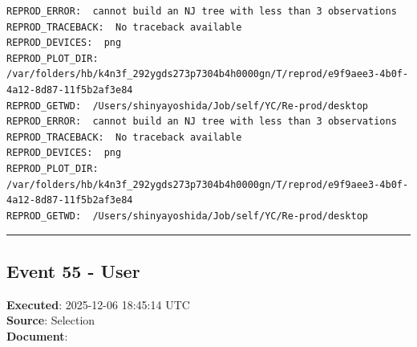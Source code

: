 \documentclass[
  11pt,
]{article}
\newenvironment{rpoutput}{\vspace{0.5em}\begin{snugshade}}{\end{snugshade}}
\begin{document}
\begin{rpoutput}

\begin{verbatim}
REPROD_ERROR:  cannot build an NJ tree with less than 3 observations 
REPROD_TRACEBACK:  No traceback available  
REPROD_DEVICES:  png 
REPROD_PLOT_DIR:  /var/folders/hb/k4n3f_292ygds273p7304b4h0000gn/T/reprod/e9f9aee3-4b0f-4a12-8d87-11f5b2af3e84 
REPROD_GETWD:  /Users/shinyayoshida/Job/self/YC/Re-prod/desktop 
REPROD_ERROR:  cannot build an NJ tree with less than 3 observations 
REPROD_TRACEBACK:  No traceback available  
REPROD_DEVICES:  png 
REPROD_PLOT_DIR:  /var/folders/hb/k4n3f_292ygds273p7304b4h0000gn/T/reprod/e9f9aee3-4b0f-4a12-8d87-11f5b2af3e84 
REPROD_GETWD:  /Users/shinyayoshida/Job/self/YC/Re-prod/desktop 
\end{verbatim}

\end{rpoutput}

\begin{center}\rule{0.5\linewidth}{0.5pt}\end{center}

\subsection{Event 55 - User}\label{event-55---user}

\textbf{Executed}: 2025-12-06 18:45:14 UTC\\
\textbf{Source}: Selection\\
\textbf{Document}:
\end{document}
